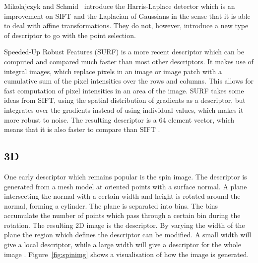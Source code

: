 \documentclass[11pt,a4paper]{kth-mag}
\begin{document}
Mikolajczyk and Schmid~\cite{mikolajczyk2004scale} introduce the Harris-Laplace
detector which is an improvement on SIFT \cite{lowe2004distinctive} and the
Laplacian of Gaussians \cite{lindeberg1998feature} in the sense that it is able
to deal with affine transformations. They do not, however, introduce a new type
of descriptor to go with the point selection. 

Speeded-Up Robust Features (SURF) is a more recent descriptor which can be
computed and compared much faster than most other descriptors. It makes use of
integral images, which replace pixels in an image or image patch with a
cumulative sum of the pixel intensities over the rows and columns. This allows
for fast computation of pixel intensities in an area of the image. SURF takes
some ideas from SIFT, using the spatial distribution of gradients as a
descriptor, but integrates over the gradients instead of using individual
values, which makes it more robust to noise. The resulting descriptor is a 64
element vector, which means that it is also faster to compare than SIFT
\cite{bay2008speeded}.

\subsection{3D}
One early descriptor which remains popular is the spin image. The descriptor is
generated from a mesh model at oriented points with a surface normal. A plane
intersecting the normal with a certain width and height is rotated around the
normal, forming a cylinder. The plane is separated into bins. The bins
accumulate the number of points which pass through a certain bin during the
rotation. The resulting 2D image is the descriptor. By varying the width of the
plane the region which defines the descriptor can be modified. A small width
will give a local descriptor, while a large width will give a descriptor for the
whole image \cite{johnson1997spin,johnson1999using}. Figure~\ref{fig:spinimg}
shows a visualisation of how the image is generated.
\end{document}
